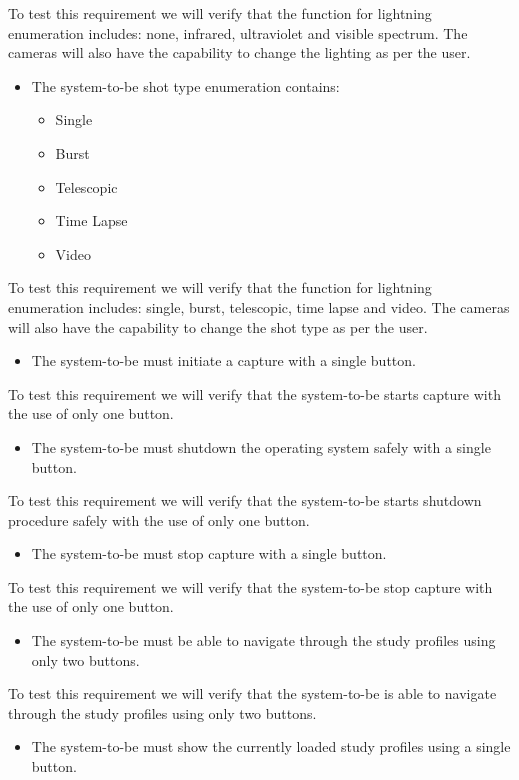 To test this requirement we will verify that the function for lightning enumeration includes: none, infrared, ultraviolet and visible spectrum. The cameras will also have the capability to change the lighting as per the user.
\begin{itemize}
    \item The system-to-be shot type enumeration contains:
	      \begin{itemize}
		      \item Single
		      \item Burst
		      \item Telescopic
		      \item Time Lapse
		      \item Video
	      \end{itemize}
\end{itemize}
To test this requirement we will verify that the function for lightning enumeration includes: single, burst, telescopic, time lapse and video. The cameras will also have the capability to change the shot type as per the user.
\begin{itemize}
    \item The system-to-be must initiate a capture with a single button.
\end{itemize}
To test this requirement we will verify that the system-to-be starts capture with the use of only one button.
\begin{itemize}
    \item The system-to-be must shutdown the operating system safely with a single button.
\end{itemize}
To test this requirement we will verify that the system-to-be starts shutdown procedure safely with the use of only one button.
\begin{itemize}
    \item The system-to-be must stop capture with a single button.
\end{itemize}
To test this requirement we will verify that the system-to-be stop capture with the use of only one button.
\begin{itemize}
   \item The system-to-be must be able to navigate through the study profiles using only two buttons.
\end{itemize}
To test this requirement we will verify that the system-to-be is able to navigate through the study profiles using only two buttons.
\begin{itemize}
	\item The system-to-be must show the currently loaded study profiles using a single button.
\end{itemize}
